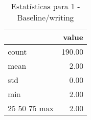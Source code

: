 \begin{table}[htbp]
\caption{Estatísticas para 1 - Baseline/writing}
\label{tab:1_-_baseline_writing_summary}
\begin{tabular}{lr}
\toprule
 & value \\
\midrule
count & 190.00 \\
mean & 2.00 \\
std & 0.00 \\
min & 2.00 \\
25%
50%
75%
max & 2.00 \\
\bottomrule
\end{tabular}
\end{table}

